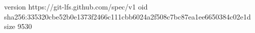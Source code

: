 version https://git-lfs.github.com/spec/v1
oid sha256:335320cbe52b0e1373f2466c111cbb6024a2f508c7bc87ea1ee6650384c02e1d
size 9530
